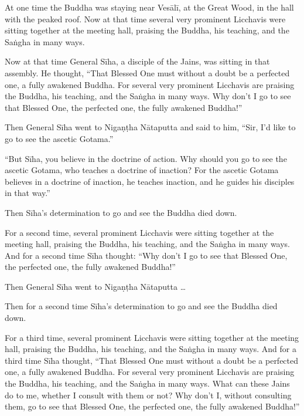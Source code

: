 \documentclass[12pt,openany]{book}%
\begin{document}
At one time the Buddha was staying near \textsanskrit{Vesālī}, at the Great Wood, in the hall with the peaked roof. Now at that time several very prominent Licchavis were sitting together at the meeting hall, praising the Buddha, his teaching, and the \textsanskrit{Saṅgha} in many ways. 

Now at that time General \textsanskrit{Sīha}, a disciple of the Jains, was sitting in that assembly. He thought, “That Blessed One must without a doubt be a perfected one, a fully awakened Buddha. For several very prominent Licchavis are praising the Buddha, his teaching, and the \textsanskrit{Saṅgha} in many ways. Why don’t I go to see that Blessed One, the perfected one, the fully awakened Buddha!” 

Then General \textsanskrit{Sīha} went to \textsanskrit{Nigaṇṭha} \textsanskrit{Nātaputta} and said to him, “Sir, I’d like to go to see the ascetic Gotama.” 

“But \textsanskrit{Sīha}, you believe in the doctrine of action. Why should you go to see the ascetic Gotama, who teaches a doctrine of inaction? For the ascetic Gotama believes in a doctrine of inaction, he teaches inaction, and he guides his disciples in that way.” 

Then \textsanskrit{Sīha}’s determination to go and see the Buddha died down. 

For a second time, several prominent Licchavis were sitting together at the meeting hall, praising the Buddha, his teaching, and the \textsanskrit{Saṅgha} in many ways. And for a second time \textsanskrit{Sīha} thought: “Why don’t I go to see that Blessed One, the perfected one, the fully awakened Buddha!” 

Then General \textsanskrit{Sīha} went to \textsanskrit{Nigaṇṭha} \textsanskrit{Nātaputta} … 

Then for a second time \textsanskrit{Sīha}’s determination to go and see the Buddha died down. 

For a third time, several prominent Licchavis were sitting together at the meeting hall, praising the Buddha, his teaching, and the \textsanskrit{Saṅgha} in many ways. And for a third time \textsanskrit{Sīha} thought, “That Blessed One must without a doubt be a perfected one, a fully awakened Buddha. For several very prominent Licchavis are praising the Buddha, his teaching, and the \textsanskrit{Saṅgha} in many ways. What can these Jains do to me, whether I consult with them or not? Why don’t I, without consulting them, go to see that Blessed One, the perfected one, the fully awakened Buddha!” 
\end{document}
